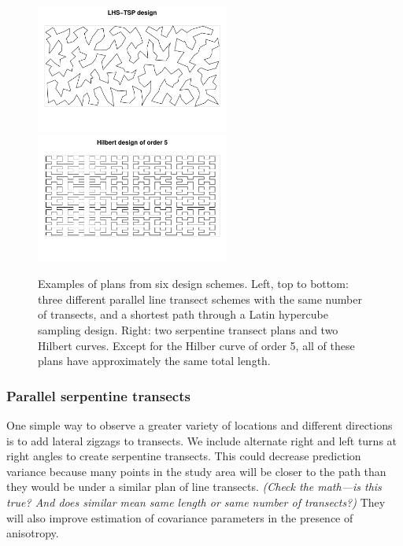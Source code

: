 \documentclass[review]{elsarticle}
\begin{document}
\begin{figure}
\includegraphics[width=2.5in]{LHS-TSP000161.pdf}
\includegraphics[width=2.5in]{Hilbert000237.pdf}

\caption{Examples of plans from six design schemes. Left, top to bottom: three
different parallel line transect schemes with the same number of transects, and
a shortest path through a Latin hypercube sampling design. Right: two
serpentine transect plans and two Hilbert curves. Except for the Hilber curve
of order 5, all of these plans have approximately the same total length.}
\label{plancomparison}
\end{figure}

\subsubsection{Parallel serpentine transects}

One simple way to observe a greater variety of locations and different
directions is to add lateral zigzags to transects. We include alternate right
and left turns at right angles to create serpentine transects. This could
decrease prediction variance because many points in the study area will be
closer to the path than they would be under a similar plan of line transects.
{\it (Check the math---is this true? And does similar mean same length or same
number of transects?)} They will also improve estimation of covariance
parameters in the presence of anisotropy.

\end{document}
